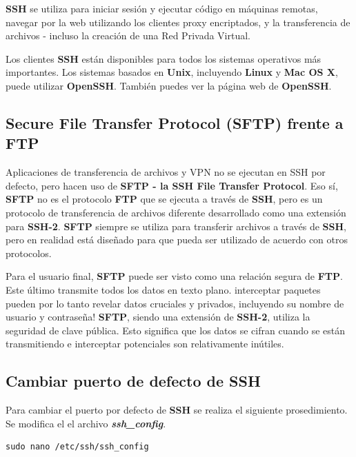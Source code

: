 \documentclass{article}
\begin{document}
\textbf{SSH} se utiliza para iniciar sesión y ejecutar código en máquinas remotas, navegar por la web utilizando los clientes proxy encriptados, y la transferencia de archivos - incluso la creación de una Red Privada Virtual.

Los clientes \textbf{SSH} están disponibles para todos los sistemas operativos más importantes. Los sistemas basados en \textbf{Unix}, incluyendo \textbf{Linux} y \textbf{Mac OS X}, puede utilizar \textbf{OpenSSH}. También puedes ver la página web de \textbf{OpenSSH}.

\subsection{Secure File Transfer Protocol (SFTP) frente a FTP}

Aplicaciones de transferencia de archivos y VPN no se ejecutan en SSH por defecto, pero hacen uso de \textbf{SFTP - la SSH File Transfer Protocol}. Eso sí, \textbf{SFTP} no es el protocolo \textbf{FTP} que se ejecuta a través de \textbf{SSH}, pero es un protocolo de transferencia de archivos diferente desarrollado como una extensión para \textbf{SSH-2}. \textbf{SFTP} siempre se utiliza para transferir archivos a través de \textbf{SSH}, pero en realidad está diseñado para que pueda ser utilizado de acuerdo con otros protocolos. \newline

Para el usuario final, \textbf{SFTP} puede ser visto como una relación segura de \textbf{FTP}. Este último transmite todos los datos en texto plano. interceptar paquetes pueden por lo tanto revelar datos cruciales y privados, incluyendo su nombre de usuario y contraseña! \textbf{SFTP}, siendo una extensión de \textbf{SSH-2}, utiliza la seguridad de clave pública. Esto significa que los datos se cifran cuando se están transmitiendo e interceptar potenciales son relativamente inútiles. 

\subsection{Cambiar puerto de defecto de SSH}
Para cambiar el puerto por defecto de \textbf{SSH} se realiza el siguiente prosedimiento. Se modifica el el archivo \textbf{\textit{ssh\_config}}.

\begin{verbatim}
sudo nano /etc/ssh/ssh_config
\end{verbatim}
\end{document}
